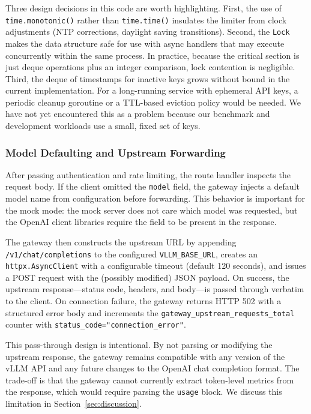 \documentclass[10pt,journal]{IEEEtran}
\begin{document}
Three design decisions in this code are worth highlighting. First, the use of \texttt{time.monotonic()} rather than \texttt{time.time()} insulates the limiter from clock adjustments (NTP corrections, daylight saving transitions). Second, the \texttt{Lock} makes the data structure safe for use with async handlers that may execute concurrently within the same process. In practice, because the critical section is just deque operations plus an integer comparison, lock contention is negligible. Third, the deque of timestamps for inactive keys grows without bound in the current implementation. For a long-running service with ephemeral API keys, a periodic cleanup goroutine or a TTL-based eviction policy would be needed. We have not yet encountered this as a problem because our benchmark and development workloads use a small, fixed set of keys.

\subsubsection{Model Defaulting and Upstream Forwarding}

After passing authentication and rate limiting, the route handler inspects the request body. If the client omitted the \texttt{model} field, the gateway injects a default model name from configuration before forwarding. This behavior is important for the mock mode: the mock server does not care which model was requested, but the OpenAI client libraries require the field to be present in the response.

The gateway then constructs the upstream URL by appending \texttt{/v1/chat/completions} to the configured \texttt{VLLM\_BASE\_URL}, creates an \texttt{httpx.AsyncClient} with a configurable timeout (default 120 seconds), and issues a POST request with the (possibly modified) JSON payload. On success, the upstream response---status code, headers, and body---is passed through verbatim to the client. On connection failure, the gateway returns HTTP 502 with a structured error body and increments the \texttt{gateway\_upstream\_requests\_total} counter with \texttt{status\_code="connection\_error"}.

This pass-through design is intentional. By not parsing or modifying the upstream response, the gateway remains compatible with any version of the vLLM API and any future changes to the OpenAI chat completion format. The trade-off is that the gateway cannot currently extract token-level metrics from the response, which would require parsing the \texttt{usage} block. We discuss this limitation in Section~\ref{sec:discussion}.
\end{document}

